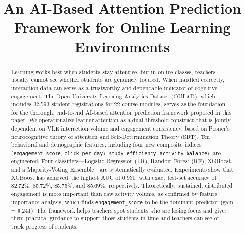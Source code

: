 \documentclass[conference]{IEEEtran}
\begin{document}
\title{An AI-Based Attention Prediction Framework for Online Learning
Environments}

\author{
\and
{}
\and
{}
\and
{}
}
\maketitle

\begin{abstract}
Learning works best when students stay attentive, but in online classes, teachers usually cannot see whether students are genuinely focused. When handled correctly, interaction data can serve as a trustworthy and dependable indicator of cognitive engagement. The Open University Learning Analytics Dataset (OULAD), which includes 32,593 student registrations for 22 course modules, serves as the foundation for the thorough, end-to-end AI-based attention prediction framework proposed in this paper. We operationalize learner attention as a dual-threshold construct that is jointly dependent on VLE interaction volume and engagement consistency, based on Posner's neurocognitive theory of attention and Self-Determination Theory (SDT). Ten behavioral and demographic features, including four new composite indices (\texttt{engagement\_score}, \texttt{click\_per\_day}), \texttt{study\_efficiency}, \texttt{activity\_balance}), are engineered. Four classifiers—Logistic Regression (LR), Random Forest (RF), XGBoost, and a Majority-Voting Ensemble—are systematically evaluated. Experiments show that XGBoost has achieved the highest AUC of 0.931, with exact test-set accuracy of 82.72\%, 85.72\%, 85.75\%, and 85.69\%, respectively. Theoretically, sustained, distributed engagement is more important than raw activity volume, as confirmed by feature-importance analysis, which finds \texttt{engagement\_score} to be the dominant predictor (gain = 0.241). The framework helps teachers spot students who are losing focus and gives them practical guidance to support those students in time and teachers can see or track progress of students.
\end{abstract}
\end{document}
